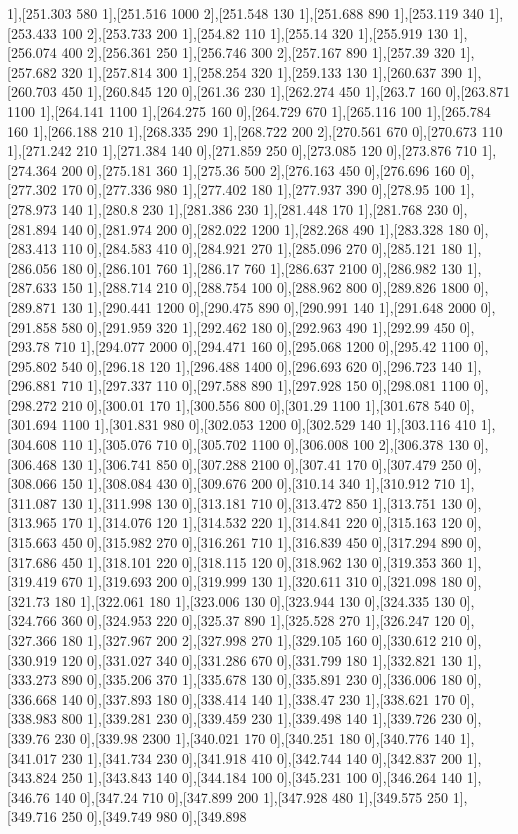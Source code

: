 {1],[251.303 580 1],[251.516 1000 2],[251.548 130 1],[251.688 890 1],[253.119 340 1],[253.433 100 2],[253.733 200 1],[254.82 110 1],[255.14 320 1],[255.919 130 1],[256.074 400 2],[256.361 250 1],[256.746 300 2],[257.167 890 1],[257.39 320 1],[257.682 320 1],[257.814 300 1],[258.254 320 1],[259.133 130 1],[260.637 390 1],[260.703 450 1],[260.845 120 0],[261.36 230 1],[262.274 450 1],[263.7 160 0],[263.871 1100 1],[264.141 1100 1],[264.275 160 0],[264.729 670 1],[265.116 100 1],[265.784 160 1],[266.188 210 1],[268.335 290 1],[268.722 200 2],[270.561 670 0],[270.673 110 1],[271.242 210 1],[271.384 140 0],[271.859 250 0],[273.085 120 0],[273.876 710 1],[274.364 200 0],[275.181 360 1],[275.36 500 2],[276.163 450 0],[276.696 160 0],[277.302 170 0],[277.336 980 1],[277.402 180 1],[277.937 390 0],[278.95 100 1],[278.973 140 1],[280.8 230 1],[281.386 230 1],[281.448 170 1],[281.768 230 0],[281.894 140 0],[281.974 200 0],[282.022 1200 1],[282.268 490 1],[283.328 180 0],[283.413 110 0],[284.583 410 0],[284.921 270 1],[285.096 270 0],[285.121 180 1],[286.056 180 0],[286.101 760 1],[286.17 760 1],[286.637 2100 0],[286.982 130 1],[287.633 150 1],[288.714 210 0],[288.754 100 0],[288.962 800 0],[289.826 1800 0],[289.871 130 1],[290.441 1200 0],[290.475 890 0],[290.991 140 1],[291.648 2000 0],[291.858 580 0],[291.959 320 1],[292.462 180 0],[292.963 490 1],[292.99 450 0],[293.78 710 1],[294.077 2000 0],[294.471 160 0],[295.068 1200 0],[295.42 1100 0],[295.802 540 0],[296.18 120 1],[296.488 1400 0],[296.693 620 0],[296.723 140 1],[296.881 710 1],[297.337 110 0],[297.588 890 1],[297.928 150 0],[298.081 1100 0],[298.272 210 0],[300.01 170 1],[300.556 800 0],[301.29 1100 1],[301.678 540 0],[301.694 1100 1],[301.831 980 0],[302.053 1200 0],[302.529 140 1],[303.116 410 1],[304.608 110 1],[305.076 710 0],[305.702 1100 0],[306.008 100 2],[306.378 130 0],[306.468 130 1],[306.741 850 0],[307.288 2100 0],[307.41 170 0],[307.479 250 0],[308.066 150 1],[308.084 430 0],[309.676 200 0],[310.14 340 1],[310.912 710 1],[311.087 130 1],[311.998 130 0],[313.181 710 0],[313.472 850 1],[313.751 130 0],[313.965 170 1],[314.076 120 1],[314.532 220 1],[314.841 220 0],[315.163 120 0],[315.663 450 0],[315.982 270 0],[316.261 710 1],[316.839 450 0],[317.294 890 0],[317.686 450 1],[318.101 220 0],[318.115 120 0],[318.962 130 0],[319.353 360 1],[319.419 670 1],[319.693 200 0],[319.999 130 1],[320.611 310 0],[321.098 180 0],[321.73 180 1],[322.061 180 1],[323.006 130 0],[323.944 130 0],[324.335 130 0],[324.766 360 0],[324.953 220 0],[325.37 890 1],[325.528 270 1],[326.247 120 0],[327.366 180 1],[327.967 200 2],[327.998 270 1],[329.105 160 0],[330.612 210 0],[330.919 120 0],[331.027 340 0],[331.286 670 0],[331.799 180 1],[332.821 130 1],[333.273 890 0],[335.206 370 1],[335.678 130 0],[335.891 230 0],[336.006 180 0],[336.668 140 0],[337.893 180 0],[338.414 140 1],[338.47 230 1],[338.621 170 0],[338.983 800 1],[339.281 230 0],[339.459 230 1],[339.498 140 1],[339.726 230 0],[339.76 230 0],[339.98 2300 1],[340.021 170 0],[340.251 180 0],[340.776 140 1],[341.017 230 1],[341.734 230 0],[341.918 410 0],[342.744 140 0],[342.837 200 1],[343.824 250 1],[343.843 140 0],[344.184 100 0],[345.231 100 0],[346.264 140 1],[346.76 140 0],[347.24 710 0],[347.899 200 1],[347.928 480 1],[349.575 250 1],[349.716 250 0],[349.749 980 0],[349.898 }
